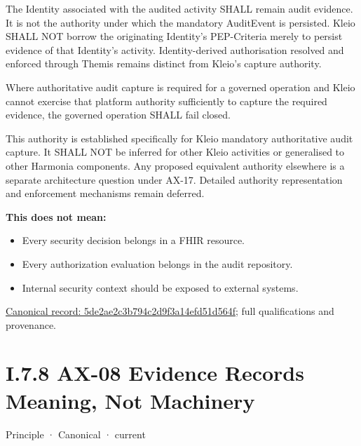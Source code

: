 The Identity associated with the audited activity SHALL remain audit evidence.
It is not the authority under which the mandatory AuditEvent is persisted.
Kleio SHALL NOT borrow the originating Identity's PEP-Criteria merely to persist
evidence of that Identity's activity. Identity-derived authorisation resolved
and enforced through Themis remains distinct from Kleio's capture authority.



Where authoritative audit capture is required for a governed operation and
Kleio cannot exercise that platform authority sufficiently to capture the
required evidence, the governed operation SHALL fail closed.



This authority is established specifically for Kleio mandatory authoritative
audit capture. It SHALL NOT be inferred for other Kleio activities or generalised
to other Harmonia components. Any proposed equivalent authority elsewhere is
a separate architecture question under AX-17. Detailed authority representation
and enforcement mechanisms remain deferred.



\textbf{This does not mean:}



\begin{itemize}


\item Every security decision belongs in a FHIR resource.

\item Every authorization evaluation belongs in the audit repository.

\item Internal security context should be exposed to external systems.

\end{itemize}

{\footnotesize \href{../../../../continuum/motivation/principle/5de2ae2c3b794c2d9f3a14efd51d564f.md}{Canonical record: 5de2ae2c3b794c2d9f3a14efd51d564f}; full qualifications and provenance.}\par
\section*{I.7.8 AX-08 Evidence Records Meaning, Not Machinery}
\label{navigation:I.7.8}

\label{element:21d6864657964ba5b03e3f6b5eb29cd5}
{\small Principle · Canonical · current}\par

